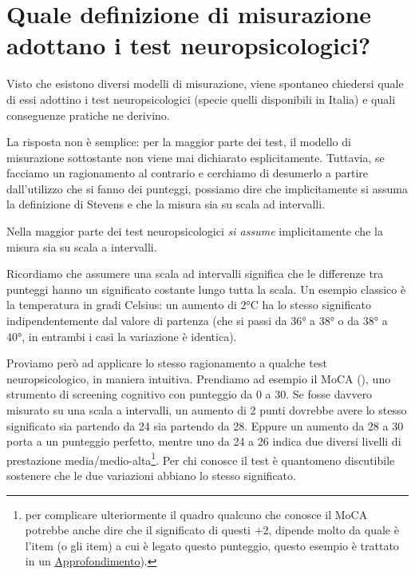 \documentclass[
  italian,
  letterpaper,
  paper=6in:9in,
  pagesize=pdftex,
  headinclude=on,
  footinclude=on,
  11pt]{scrbook}
\begin{document}
\section{Quale definizione di misurazione adottano i test
neuropsicologici?}\label{quale-definizione-di-misurazione-adottano-i-test-neuropsicologici}

Visto che esistono diversi modelli di misurazione, viene spontaneo
chiedersi quale di essi adottino i test neuropsicologici (specie quelli
disponibili in Italia) e quali conseguenze pratiche ne derivino.

La risposta non è semplice: per la maggior parte dei test, il modello di
misurazione sottostante non viene mai dichiarato esplicitamente.
Tuttavia, se facciamo un ragionamento al contrario e cerchiamo di
desumerlo a partire dall'utilizzo che si fanno dei punteggi, possiamo
dire che implicitamente si assuma la definizione di Stevens e che la
misura sia su scala ad intervalli.

\begin{tcolorbox}[enhanced jigsaw, title=\textcolor{quarto-callout-important-color}{\faExclamation}\hspace{0.5em}{Importante}, coltitle=black, bottomtitle=1mm, colback=white, bottomrule=.15mm, rightrule=.15mm, breakable, toptitle=1mm, left=2mm, colbacktitle=quarto-callout-important-color!10!white, titlerule=0mm, colframe=quarto-callout-important-color-frame, leftrule=.75mm, opacitybacktitle=0.6, arc=.35mm, toprule=.15mm, opacityback=0]

Nella maggior parte dei test neuropsicologici \emph{si assume}
implicitamente che la misura sia su scala a intervalli.

\end{tcolorbox}

Ricordiamo che assumere una scala ad intervalli significa che le
differenze tra punteggi hanno un significato costante lungo tutta la
scala. Un esempio classico è la temperatura in gradi Celsius: un aumento
di 2°C ha lo stesso significato indipendentemente dal valore di partenza
(che si passi da 36° a 38° o da 38° a 40°, in entrambi i casi la
variazione è identica).

Proviamo però ad applicare lo stesso ragionamento a qualche test
neuropsicologico, in maniera intuitiva. Prendiamo ad esempio il MoCA
(\cite{nasreddine2005montreal}), uno strumento di screening cognitivo
con punteggio da 0 a 30. Se fosse davvero misurato su una scala a
intervalli, un aumento di 2 punti dovrebbe avere lo stesso significato
sia partendo da 24 sia partendo da 28. Eppure un aumento da 28 a 30
porta a un punteggio perfetto, mentre uno da 24 a 26 indica due diversi
livelli di prestazione media/medio-alta\footnote{per complicare
  ulteriormente il quadro qualcuno che conosce il MoCA potrebbe anche
  dire che il significato di questi \(+2\), dipende molto da quale è
  l'item (o gli item) a cui è legato questo punteggio, questo esempio è
  trattato in un
  \hyperref[Approfondimento-item-arbitrari]{Approfondimento}).}. Per chi
conosce il test è quantomeno discutibile sostenere che le due variazioni
abbiano lo stesso significato.
\end{document}
